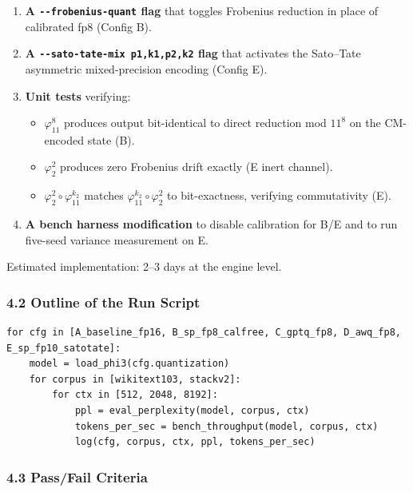 \documentclass[
  11pt,
]{article}
\providecommand{\tightlist}{%
  \setlength{\itemsep}{0pt}\setlength{\parskip}{0pt}}
\begin{document}
\begin{enumerate}
\def\labelenumi{\arabic{enumi}.}
\tightlist
\item
  \textbf{A \texttt{-\/-frobenius-quant} flag} that toggles Frobenius
  reduction in place of calibrated fp8 (Config B).
\item
  \textbf{A \texttt{-\/-sato-tate-mix\ p1,k1,p2,k2} flag} that activates
  the Sato--Tate asymmetric mixed-precision encoding (Config E).
\item
  \textbf{Unit tests} verifying:

  \begin{itemize}
  \tightlist
  \item
    \(\varphi_{11}^8\) produces output bit-identical to direct reduction
    mod \(11^8\) on the CM-encoded state (B).
  \item
    \(\varphi_2^2\) produces zero Frobenius drift exactly (E inert
    channel).
  \item
    \(\varphi_2^2 \circ \varphi_{11}^{k_2}\) matches
    \(\varphi_{11}^{k_2} \circ \varphi_2^2\) to bit-exactness, verifying
    commutativity (E).
  \end{itemize}
\item
  \textbf{A bench harness modification} to disable calibration for B/E
  and to run five-seed variance measurement on E.
\end{enumerate}

Estimated implementation: 2--3 days at the engine level.

\hypertarget{outline-of-the-run-script}{%
\subsubsection{4.2 Outline of the Run
Script}\label{outline-of-the-run-script}}

\begin{verbatim}
for cfg in [A_baseline_fp16, B_sp_fp8_calfree, C_gptq_fp8, D_awq_fp8, E_sp_fp10_satotate]:
    model = load_phi3(cfg.quantization)
    for corpus in [wikitext103, stackv2]:
        for ctx in [512, 2048, 8192]:
            ppl = eval_perplexity(model, corpus, ctx)
            tokens_per_sec = bench_throughput(model, corpus, ctx)
            log(cfg, corpus, ctx, ppl, tokens_per_sec)
\end{verbatim}

\hypertarget{passfail-criteria}{%
\subsubsection{4.3 Pass/Fail Criteria}\label{passfail-criteria}}
\end{document}

